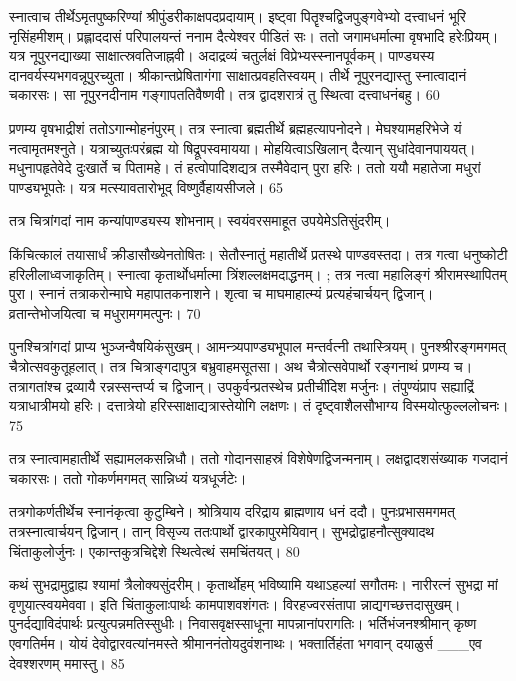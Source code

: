 स्नात्वाच तीर्थेऽमृतपुष्करिण्यां
श्रीपुंडरीकाक्षपदप्रदायाम्।
इष्ट्वा पितॄश्चद्विजपुङ्गवेभ्यो
दत्त्वाधनं भूरि नृसिंहमीशम्।
प्रह्लाददासं परिपालयन्तं ननाम
दैत्येश्वर पीडितं सः।
ततो जगामधर्मात्मा वृषभादि हरेःप्रियम्।
यत्र नूपुरनद्याख्या साक्षात्स्रवतिजाह्नवी।
अदाद्रव्यं चतुर्लक्षं विप्रेभ्यस्स्नानपूर्वकम्।
पाण्ड्यस्य दानवर्यस्यभगवन्नूपुरच्युता।
श्रीकान्तप्रेषितागंगा साक्षात्प्रवहतिस्वयम्।
तीर्थे नूपुरनद्यास्तु स्नात्वादानं चकारसः।
सा नूपुरनदीनाम गङ्गापततिवैष्णवी।
तत्र द्वादशरात्रं तु स्थित्वा दत्त्वाधनंबहु।
60

प्रणम्य वृषभाद्रीशं ततोऽगान्मोहनंपुरम्।
तत्र स्नात्वा ब्रह्मतीर्थे ब्रह्महत्यापनोदने।
मेघश्यामहरिभेजे यं नत्वामृतमश्नुते।
यत्राच्युतःपरंब्रह्म यो षिद्रूपस्वमायया।
मोहयित्वाऽखिलान् दैत्यान् सुधांदेवानपाययत्।
मधुनापहृतेवेदे दुःखार्ते च पितामहे।
तं हत्वोपादिशद्यत्र तस्मैवेदान् पुरा हरिः।
ततो ययौ महातेजा मधुरां पाण्ड्यभूपतेः।
यत्र मत्स्यावतारोभूद् विष्णुर्वैहायसीजले।
65

तत्र चित्रांगदां नाम कन्यांपाण्ड्यस्य शोभनाम्।
स्वयंवरसमाहूत उपयेमेऽतिसुंदरीम्।

किंचित्कालं तयासार्धं क्रीडासौख्येनतोषितः।
सेतौस्नातुं महातीर्थे प्रतस्थे पाण्डवस्तदा।
तत्र गत्वा धनुष्कोटी हरिलीलाध्वजाकृतिम्।
स्नात्वा कृतार्थोधर्मात्मा त्रिंशल्लक्षमदाद्धनम्।
; तत्र नत्वा महालिङ्गं श्रीरामस्थापितम् पुरा।
स्नानं तत्राकरोन्माघे महापातकनाशने।
शृत्वा च माघमाहात्म्यं प्रत्यहंचार्चयन् द्विजान्।
व्रतान्तेभोजयित्वा च मधुरामगमत्पुनः।
70

पुनश्चित्रांगदां प्राप्य भुञ्जन्वैषयिकंसुखम्।
आमन्त्र्यपाण्ड्यभूपाल मन्तर्वत्नी तथास्त्रियम्।
पुनश्श्रीरङ्गमगमत् चैत्रोत्सवकुतूहलात्।
तत्र चित्राङ्गदापुत्र बभ्रुवाहमसूतसा।
अथ चैत्रोत्सवेपार्थो रङ्गनाथं प्रणम्य च।
तत्रागतांश्च द्रव्यायै रन्नस्सन्तर्प्य च द्विजान्।
उपकुर्वन्प्रतस्थेच प्रतीचींदिश मर्जुनः।
तंपुण्यंप्राप सह्याद्रिं यत्राधात्रीमयो हरिः।
दत्तात्रेयो हरिस्साक्षाद्यत्रास्तेयोगि लक्षणः।
तं दृष्ट्वाशैलसौभाग्य विस्मयोत्फुल्ललोचनः।
75

तत्र स्नात्वामहातीर्थे सह्यामलकसन्निधौ।
ततो गोदानसाहस्रं विशेषेणद्विजन्मनाम्।
लक्षद्वादशसंख्याक गजदानं चकारसः।
ततो गोकर्णमगमत् सान्निध्यं यत्रधूर्जटेः।

तत्रगोकर्णतीर्थेच स्नानंकृत्वा कुटुम्बिने।
श्रोत्रियाय दरिद्राय ब्राह्मणाय धनं ददौ।
पुनःप्रभासमगमत् तत्रस्नात्वार्चयन् द्विजान्।
तान् विसृज्य ततःपार्थो द्वारकापुरमेयिवान्।
सुभद्रोद्वाहनौत्सुक्यादथ चिंताकुलोर्जुनः।
एकान्तकुत्रचिद्देशे स्थित्वेत्थं समचिंतयत्।
80

कथं सुभद्रामुद्वाह्य श्यामां त्रैलोक्यसुंदरीम्।
कृतार्थोहम् भविष्यामि यथाऽहल्यां सगौतमः।
नारीरत्नं सुभद्रा मां वृणुयात्स्वयमेववा।
इति चिंताकुलाःपार्थः कामपाशवशंगतः।
विरहज्वरसंतापा न्नाद्यगच्छत्तदासुखम्।
पुनर्दद्याविदंपार्थः प्रत्युत्पन्नमतिस्सुधीः।
निवासवृक्षस्साधूना मापन्नानांपरागतिः।
भर्तिभंजनश्श्रीमान् कृष्ण एवगतिर्मम।
योयं देवोद्वारवत्यांनमस्ते श्रीमाननंतोयदुवंशनाथः।
भक्तार्तिहंता भगवान् दयाळुर्स
___एव देवश्शरणम् ममास्तु।
85


